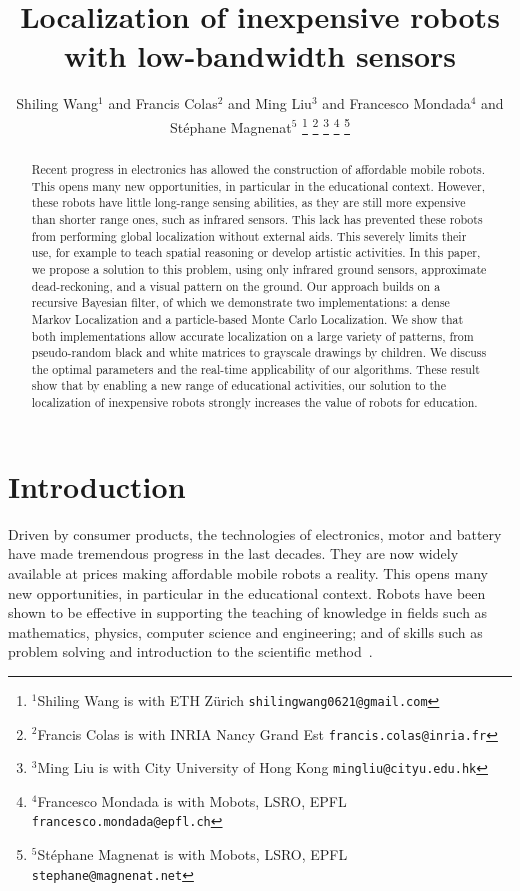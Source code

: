 \documentclass[letterpaper, 10pt, conference]{ieeeconf}
\title{\LARGE \bf
Localization of inexpensive robots with low-bandwidth sensors
}
\author{Shiling Wang$^{1}$ and Francis Colas$^{2}$ and Ming Liu$^{3}$ and Francesco Mondada$^{4}$ and Stéphane Magnenat$^{5}$%
\thanks{$^{1}$Shiling Wang is with ETH Zürich
        {\tt\small shilingwang0621@gmail.com}}%
\thanks{$^{2}$Francis Colas is with INRIA Nancy Grand Est
        {\tt\small francis.colas@inria.fr}}%
\thanks{$^{3}$Ming Liu is with City University of Hong Kong
        {\tt\small mingliu@cityu.edu.hk}}%
\thanks{$^{4}$Francesco Mondada is with Mobots, LSRO, EPFL
        {\tt\small francesco.mondada@epfl.ch}}%
\thanks{$^{5}$Stéphane Magnenat is with Mobots, LSRO, EPFL
        {\tt\small stephane@magnenat.net}}%
}
\begin{document}
\maketitle
\thispagestyle{empty}
\pagestyle{empty}

\begin{abstract}
Recent progress in electronics has allowed the construction of affordable mobile robots.
This opens many new opportunities, in particular in the educational context.
However, these robots have little long-range sensing abilities, as they are still more expensive than shorter range ones, such as infrared sensors.
This lack has prevented these robots from performing global localization without external aids.
This severely limits their use, for example to teach spatial reasoning or develop artistic activities.
In this paper, we propose a solution to this problem, using only infrared ground sensors, approximate dead-reckoning, and a visual pattern on the ground.
Our approach builds on a recursive Bayesian filter, of which we demonstrate two implementations: a dense Markov Localization and a particle-based Monte Carlo Localization.
We show that both implementations allow accurate localization on a large variety of patterns, from pseudo-random black and white matrices to grayscale drawings by children.
We discuss the optimal parameters and the real-time applicability of our algorithms.
These result show that by enabling a new range of educational activities, our solution to the localization of inexpensive robots strongly increases the value of robots for education.
\end{abstract}

\section{Introduction}

Driven by consumer products, the technologies of electronics, motor and battery have made tremendous progress in the last decades.
They are now widely available at prices making affordable mobile robots a reality.
This opens many new opportunities, in particular in the educational context.
Robots have been shown to be effective in supporting the teaching of knowledge in fields such as mathematics, physics, computer science and engineering; and of skills such as problem solving and introduction to the scientific method~\cite{benitti2012explorin}.
\end{document}
